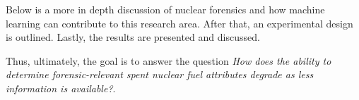 Below is a more in depth discussion of nuclear forensics and
how machine learning can contribute to this research area. After that, an
experimental design is outlined. Lastly, the results are presented and
discussed. 

Thus, ultimately, the goal is to answer the question \textit{How
does the ability to determine forensic-relevant spent nuclear fuel attributes
degrade as less information is available?}. 




